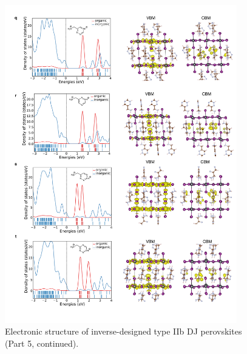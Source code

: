 \begin{figure}[htbp]
    \ContinuedFloat
    \centering
    \includegraphics[width=0.9\textwidth]{figures/synthesis-feasibility/figure5-25-5.png}
    \caption{Electronic structure of inverse-designed type IIb DJ perovskites (Part 5, continued).}
\end{figure}

